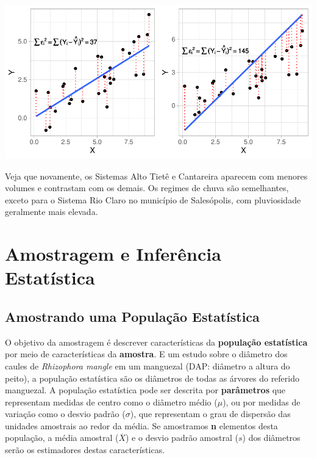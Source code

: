 \documentclass[
]{book}
\begin{document}
\begin{center}\includegraphics{probest-cambientais_files/figure-latex/unnamed-chunk-46-1} \end{center}

Veja que novamente, os Sistemas Alto Tietê e Cantareira aparecem com menores volumes e contrastam com os demais. Os regimes de chuva são semelhantes, exceto para o Sistema Rio Claro no município de Salesópolis, com pluviosidade geralmente mais elevada.

\hypertarget{part-amostragem-e-inferuxeancia-estatuxedstica}{%
\part{Amostragem e Inferência Estatística}\label{part-amostragem-e-inferuxeancia-estatuxedstica}}

\hypertarget{amostrmedias}{%
\chapter{Amostrando uma População Estatística}\label{amostrmedias}}

O objetivo da amostragem é descrever características da \textbf{população estatística} por meio de características da \textbf{amostra}. E um estudo sobre o diâmetro dos caules de \emph{Rhizophora mangle} em um manguezal (DAP: diâmetro a altura do peito), a população estatística são os diâmetros de todas as árvores do referido manguezal. A população estatística pode ser descrita por \textbf{parâmetros} que representam medidas de centro como o diâmetro médio (\(\mu\)), ou por medidas de variação como o desvio padrão (\(\sigma\)), que representam o grau de dispersão das unidades amostrais ao redor da média. Se amostramos \textbf{n} elementos desta população, a média amostral (\(\overline{X}\)) e o desvio padrão amostral (\(s\)) dos diâmetros serão os estimadores destas características.
\end{document}
